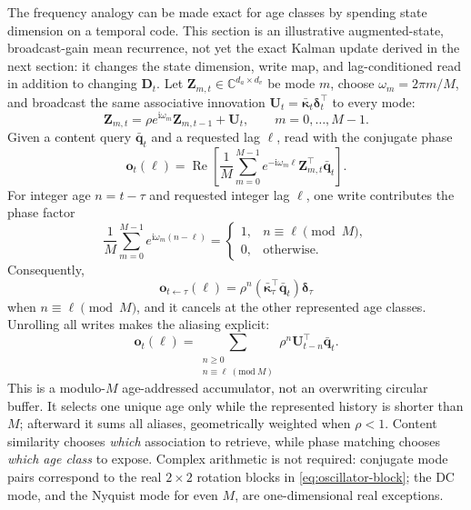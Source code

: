 \documentclass[11pt]{article}
\newcommand{\C}{\mathbb{C}}
\newcommand{\ve}[1]{\boldsymbol{#1}}
\newcommand{\tr}{\intercal}
\DeclareMathOperator{\RePart}{Re}
\begin{document}
The frequency analogy can be made exact for age classes by spending state dimension on a
temporal code. This section is an illustrative augmented-state, broadcast-gain mean
recurrence, not yet the exact Kalman update derived in the next section: it changes the state
dimension, write map, and lag-conditioned read in addition to changing $\ve{D}_t$.
Let $\ve{Z}_{m,t}\in\C^{d_a\times d_v}$ be mode $m$, choose
$\omega_m=2\pi m/M$, and broadcast the same associative innovation
$\ve{U}_t=\bar{\ve{\kappa}}_t\ve{\delta}_t^{\tr}$ to every mode:
\begin{equation}
  \ve{Z}_{m,t}
  =\rho e^{\mathrm{i}\omega_m}\ve{Z}_{m,t-1}+\ve{U}_t,
  \qquad m=0,\ldots,M-1.
  \label{eq:complex-delay-write}
\end{equation}
Given a content query $\bar{\ve{q}}_t$ and a requested lag $\ell$, read with the conjugate
phase
\begin{equation}
  \ve{o}_t(\ell)
  =\RePart\!\left[
    \frac{1}{M}\sum_{m=0}^{M-1}
    e^{-\mathrm{i}\omega_m\ell}\ve{Z}_{m,t}^{\tr}\bar{\ve{q}}_t
  \right].
  \label{eq:complex-delay-read}
\end{equation}
For integer age $n=t-\tau$ and requested integer lag $\ell$, one write contributes the phase factor
\begin{equation}
  \frac{1}{M}\sum_{m=0}^{M-1}
  e^{\mathrm{i}\omega_m(n-\ell)}
  =
  \begin{cases}
    1,&n\equiv\ell\pmod M,\\
    0,&\text{otherwise}.
  \end{cases}
  \label{eq:fourier-delay-identity}
\end{equation}
Consequently,
\begin{equation}
  \ve{o}_{t\leftarrow\tau}(\ell)
  =\rho^n
   (\bar{\ve{\kappa}}_\tau^{\tr}\bar{\ve{q}}_t)
   \ve{\delta}_\tau
\end{equation}
when $n\equiv\ell\pmod M$, and it cancels at the other represented age classes. Unrolling all
writes makes the aliasing explicit:
\begin{equation}
  \ve{o}_t(\ell)
  =\sum_{\substack{n\geq0\\n\equiv\ell\ (\mathrm{mod}\ M)}}
   \rho^n\ve{U}_{t-n}^{\tr}\bar{\ve{q}}_t.
  \label{eq:modulo-age-accumulator}
\end{equation}
This is a modulo-$M$ age-addressed accumulator, not an overwriting circular buffer. It selects
one unique age only while the represented history is shorter than $M$; afterward it sums all
aliases, geometrically weighted when $\rho<1$. Content similarity chooses \emph{which}
association to retrieve, while phase matching chooses \emph{which age class} to expose.
Complex arithmetic is not required: conjugate mode pairs correspond to the real $2\times2$
rotation blocks in \eqref{eq:oscillator-block}; the DC mode, and the Nyquist mode for even
$M$, are one-dimensional real exceptions.
\end{document}
